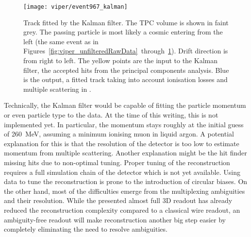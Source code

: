 \begin{figure}[htb]
	\centering
	\texttt{[image: viper/event967\_kalman]}
	\caption{Track fitted by the Kalman filter.
	The TPC volume is shown in faint grey.
	The passing particle is most likely a cosmic \Pgm entering from the left (the same event as in Figures~\ref{fig:viper_unfilteredRawData}~through~\ref{fig:viper_kalman}).
	Drift direction is from right to left.
	The yellow points are the input to the Kalman filter, the accepted hits from the principal components analysis.
	Blue is the output, a fitted track taking into account ionisation losses and multiple scattering in \lar{}.}
	\label{fig:viper_kalman}
\end{figure}

Technically, the Kalman filter would be capable of fitting the particle momentum or even particle type to the data.
At the time of this writing, this is not implemented yet.
In particular, the momentum stays roughly at the initial guess of \SI{260}{\mega\electronvolt}, assuming a minimum ionising muon in liquid argon.
A potential explanation for this is that the resolution of the detector is too low to estimate momentum from multiple scattering.
Another explanation might be the hit finder missing hits due to non-optimal tuning.
Proper tuning of the reconstruction requires a full simulation chain of the detector which is not yet available.
Using data to tune the reconstruction is prone to the introduction of circular biases.
On the other hand, most of the difficulties emerge from the multiplexing ambiguities and their resolution.
While the presented almost full 3D readout has already reduced the reconstruction complexity compared to a classical wire readout, an ambiguity-free readout will make reconstruction another big step easier by completely eliminating the need to resolve ambiguities.